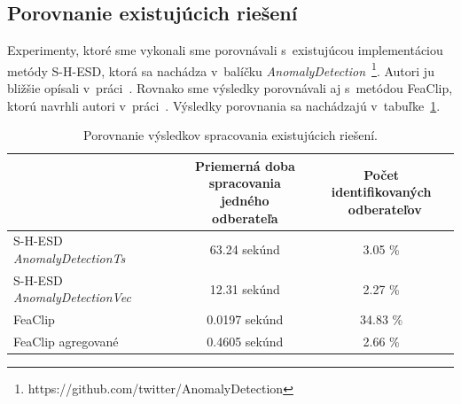 \documentclass[a4paper,twoside,slovak,12pt,appendix]{article}
\begin{document}
\subsection{Porovnanie existujúcich riešení}
Experimenty, ktoré sme vykonali sme porovnávali s~existujúcou implementáciou
metódy S-H-ESD, ktorá sa nachádza v~balíčku
\textit{AnomalyDetection}~\footnote{https://github.com/twitter/AnomalyDetection}.
Autori ju bližšie opísali v~práci~\cite{Hochenbaum2014}. Rovnako sme výsledky
porovnávali aj s~metódou FeaClip, ktorú navrhli autori
v~práci~\cite{Laurinec2018}. Výsledky porovnania sa nachádzajú
v~tabuľke~\ref{tab:existing-solutions}.

\begin{table}[ht]
  \centering
  \caption{Porovnanie výsledkov spracovania existujúcich riešení.}
  \label{tab:existing-solutions}
  \begin{tabular}{|l|c|c|}
    \hline
    &   \shortstack{\textbf{Priemerná doba} \\ \textbf{spracovania jedného} \\  \textbf{odberateľa}}  &   \shortstack{\textbf{Počet identifikovaných} \\ \textbf{odberateľov}}  \\ \hline
    S-H-ESD \textit{AnomalyDetectionTs}     &   63.24 sekúnd                      &       3.05 \%        \\ \hline
    S-H-ESD \textit{AnomalyDetectionVec}    &   12.31 sekúnd                      &       2.27 \%        \\ \hline
    FeaClip                                 &   0.0197 sekúnd                     &       34.83 \%       \\ \hline
    FeaClip agregované                      &   0.4605 sekúnd                     &       2.66 \%        \\ \hline
  \end{tabular}
\end{table}
\end{document}
